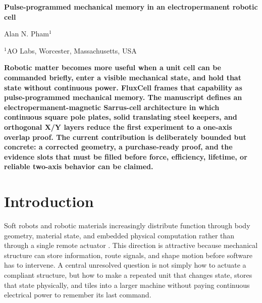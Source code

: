 \documentclass[12pt,letterpaper]{article}
\newcommand{\fluxcell}{FluxCell}
\begin{document}
\linenumbers
\thispagestyle{empty}

\begin{center}
    \vspace*{-0.6em}

    {\fontsize{20}{22}\selectfont\bfseries\color{SumiInk}
    Pulse-programmed mechanical memory in an electropermanent robotic cell\par}

    \vspace{0.95em}

    {\normalsize\color{SumiInk}
    Alan N. Pham$^{1}$\par}

    \vspace{0.38em}

    {\small\color{DustyTaupe}
    $^{1}$AO Labs, Worcester, Massachusetts, USA\par}
\end{center}

\vspace{0.35em}
\noindent\textbf{Robotic matter becomes more useful when a unit cell can be commanded briefly, enter a visible mechanical state, and hold that state without continuous power. \fluxcell{} frames that capability as pulse-programmed mechanical memory. The manuscript defines an electropermanent-magnetic Sarrus-cell architecture in which continuous square pole plates, solid translating steel keepers, and orthogonal X/Y layers reduce the first experiment to a one-axis overlap proof. The current contribution is deliberately bounded but concrete: a corrected geometry, a purchase-ready proof, and the evidence slots that must be filled before force, efficiency, lifetime, or reliable two-axis behavior can be claimed.}

\newpage
\pagestyle{fancy}

\section{Introduction}

Soft robots and robotic materials increasingly distribute function through body geometry, material state, and embedded physical computation rather than through a single remote actuator \cite{rus2015,wehner2016,byun2024}. This direction is attractive because mechanical structure can store information, route signals, and shape motion before software has to intervene. A central unresolved question is not simply how to actuate a compliant structure, but how to make a repeated unit that changes state, stores that state physically, and tiles into a larger machine without paying continuous electrical power to remember its last command.
\end{document}
